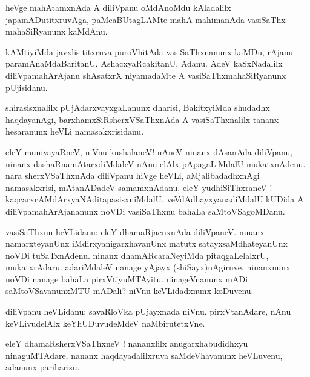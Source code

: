 \documentclass{article}
\begin{document}
\begin{mn}
heVge mahAtamxnAda A diliVpanu oMdAnoMdu kAladalilx japamADutitxruvAga, paMcaBUtagLAMte 
mahA mahimanAda vasiSaThx mahaSiRyanunx kaMdAnu.
\end{mn}

\begin{mn}
kAMtiyiMda javxlisititxruva puroVhitAda vasiSaThxnanunx kaMDu, rAjanu paramAnaMdaBaritanU,
AshacxyaRcakitanU, Adanu. AdeV kaSxNadalilx diliVpamahArAjanu shAsatxrX niyamadaMte A
vasiSaThxmahaSiRyanunx pUjisidanu.
\end{mn}

\begin{mn}
shirasisxnalilx pUjAdarxvayxgaLanunx dharisi, BakitxyiMda shudadhx haqdayanAgi, 
barxhamxSiRsherxVSaThxnAda A vasiSaThxnalilx tananx hesaranunx heVLi namasakxrisidanu.
\end{mn}

\begin{mn}
eleY munivayaRneV, niVnu kushalaneV! nAneV ninanx dAsanAda diliVpanu, ninanx dashaRnamAtarxdiMdaleV
nAnu elAlx pApagaLiMdalU mukatxnAdenu. nara sherxVSaThxnAda diliVpanu hiVge heVLi, 
aMjalibadadhxnAgi namasakxrisi, mAtanADadeV samamxnAdanu. eleY yudhiSiThxraneV ! 
kaqcarxcAMdArxyaNAditapasisxniMdalU, veVdAdhayxyanadiMdalU kUDida A diliVpamahArAjananunx noVDi  
vasiSaThxnu bahaLa saMtoVSagoMDanu.
\end{mn}


\begin{mn}
vasiSaThxnu heVLidanu: eleY dhamaRjacnxnAda diliVpaneV.
ninanx namarxteyanUnx iMdirxyanigarxhavanUnx matutx satayxsaMdhateyanUnx noVDi tuSaTxnAdenu.
ninanx dhamARcaraNeyiMda pitaqgaLelalxrU, mukatxrAdaru. adariMdaleV nanage yAjayx 
(shiSayx)nAgiruve. ninanxnunx noVDi nanage bahaLa pirxVtiyuMTAyitu. ninageVnanunx mADi 
saMtoVSavanunxMTU mADali? niVnu keVLidadxnunx koDuvenu. 
\end{mn}

\begin{mn}
diliVpanu heVLidanu: savaRloVka pUjayxnada niVnu, pirxVtanAdare, nAnu keVLivudelAlx 
keYhUDuvudeMdeV naMbirutetxVne.
\end{mn}

\begin{mn}
eleY dhamaRsherxVSaThxneV ! nananxlilx anugarxhabudidhxyu ninaguMTAdare, nananx 
haqdayadalilxruva saMdeVhavanunx heVLuvenu, adanunx pariharisu.
\end{mn}
\end{document}
